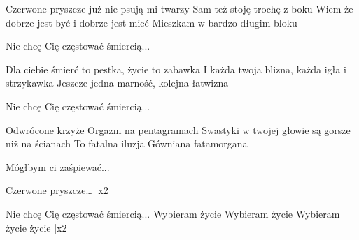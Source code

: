 \documentclass[../../../songbook.tex]{subfiles}
\begin{document}
{\-\hspace{1cm} Czerwone pryszcze już nie psują mi twarzy	 \newline
\-\hspace{1cm} Sam też stoję trochę z boku					 \newline
\-\hspace{1cm} Wiem że dobrze jest być i dobrze jest mieć	 \newline
\-\hspace{1cm} Mieszkam w bardzo długim bloku				 \newline

Nie chcę Cię częstować śmiercią...  \newline
                     
Dla ciebie śmierć to pestka, życie to zabawka	 \newline
I każda twoja blizna, każda igła i strzykawka	 \newline
Jeszcze jedna marność, kolejna łatwizna	   \newline
		
Nie chcę Cię częstować śmiercią...	 \newline
          
Odwrócone krzyże Orgazm na pentagramach			  \newline               
Swastyki w twojej głowie są gorsze niż na ścianach	  \newline     
To fatalna iluzja Gówniana fatamorgana	 \newline

Mógłbym ci zaśpiewać... \newline

\-\hspace{1cm} Czerwone pryszcze… |x2 \newline

Nie chcę Cię częstować śmiercią... \newline
Wybieram życie	 \newline
Wybieram życie	  \newline
Wybieram życie	 \newline
życie		 			 |x2 \newline
}
\end{document}
